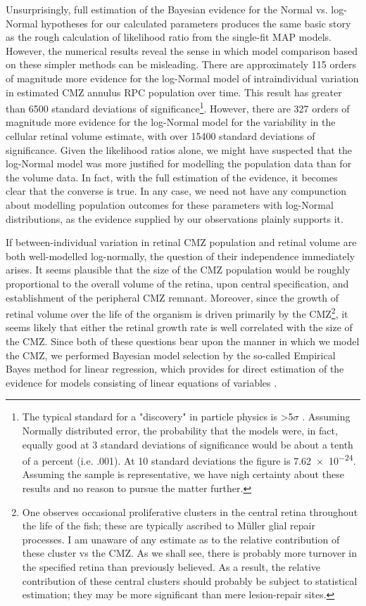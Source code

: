 Unsurprisingly, full estimation of the Bayesian evidence for the Normal vs. log-Normal hypotheses for our calculated parameters produces the same basic story as the rough calculation of likelihood ratio from the single-fit MAP models. However, the numerical results reveal the sense in which model comparison based on these simpler methods can be misleading. There are approximately 115 orders of magnitude more evidence for the log-Normal model of intraindividual variation in estimated CMZ annulus RPC population over time. This result has greater than 6500 standard deviations of significance\footnote{The typical standard for a "discovery" in particle physics is >5$\sigma$ \cite{Lyons2013}. Assuming Normally distributed error, the probability that the models were, in fact, equally good at 3 standard deviations of significance would be about a tenth of a percent (i.e. .001). At 10 standard deviations the figure is \num{7.62e-24}. Assuming the sample is representative, we have nigh certainty about these results and no reason to pursue the matter further.}. However, there are 327 orders of magnitude more evidence for the log-Normal model for the variability in the cellular retinal volume estimate, with over 15400 standard deviations of significance. Given the likelihood ratios alone, we might have suspected that the log-Normal model was more justified for modelling the population data than for the volume data. In fact, with the full estimation of the evidence, it becomes clear that the converse is true. In any case, we need not have any compunction about modelling population outcomes for these parameters with log-Normal distributions, as the evidence supplied by our observations plainly supports it.

If between-individual variation in retinal CMZ population and retinal volume are both well-modelled log-normally, the question of their independence immediately arises. It seems plausible that the size of the CMZ population would be roughly proportional to the overall volume of the retina, upon central specification, and establishment of the peripheral CMZ remnant. Moreover, since the growth of retinal volume over the life of the organism is driven primarily by the CMZ\footnote{One observes occasional proliferative clusters in the central retina throughout the life of the fish; these are typically ascribed to M\"{u}ller glial repair processes. I am unaware of any estimate as to the relative contribution of these cluster vs the CMZ. As we shall see, there is probably more turnover in the specified retina than previously believed. As a result, the relative contribution of these central clusters should probably be subject to statistical estimation; they may be more significant than mere lesion-repair sites.}, it seems likely that either the retinal growth rate is well correlated with the size of the CMZ. Since both of these questions bear upon the manner in which we model the CMZ, we performed Bayesian model selection by the so-called Empirical Bayes method for linear regression, which provides for direct estimation of the evidence for models consisting of linear equations of variables \cite{Bishop2006}.


